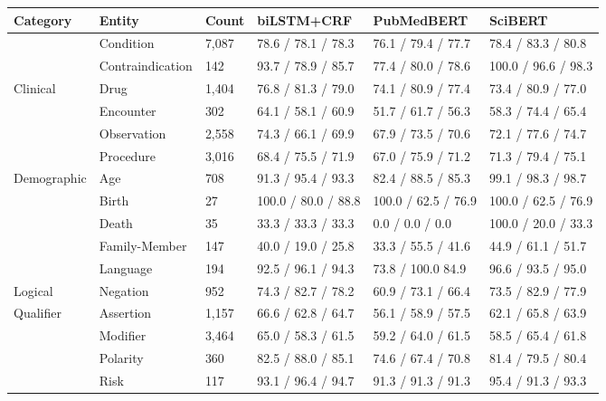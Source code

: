 \documentclass[fleqn,10pt]{wlscirep}
\begin{document}
\begin{table}[tp]
    \def\arraystretch{1.4}
\begin{tabular}{m{2cm} m{3.2cm} m{1.4cm} m{2.7cm} m{2.7cm} m{2.7cm}}
    \toprule
    \textbf{Category} & \textbf{Entity} & \textbf{Count} & \textbf{biLSTM+CRF} & \textbf{PubMedBERT} & \textbf{SciBERT} \\ \midrule
     & Condition & 7,087 & 78.6 / 78.1 / 78.3 & 76.1 / 79.4 / 77.7 & 78.4 / 83.3 / 80.8 \\
     & Contraindication & 142 & 93.7 / 78.9 / 85.7 & 77.4 / 80.0 / 78.6 & 100.0 / 96.6 / 98.3 \\
    Clinical & Drug & 1,404 & 76.8 / 81.3 / 79.0 & 74.1 / 80.9 / 77.4 & 73.4 / 80.9 / 77.0 \\
     & Encounter & 302 & 64.1 / 58.1 / 60.9 & 51.7 / 61.7 / 56.3 & 58.3 / 74.4 / 65.4 \\
     & Observation & 2,558 & 74.3 / 66.1 / 69.9 & 67.9 / 73.5 / 70.6 & 72.1 / 77.6 / 74.7 \\
     & Procedure & 3,016 & 68.4 / 75.5 / 71.9 & 67.0 / 75.9 / 71.2 & 71.3 / 79.4 / 75.1 \\
    \hline       
    \multirow{4}{}[-4pt]{\mbox{Demographic}} & 
        Age & 708 & 91.3 / 95.4 / 93.3 & 82.4 / 88.5 / 85.3 & 99.1 / 98.3 / 98.7 \\
     & Birth & 27 & 100.0 / 80.0 / 88.8 & 100.0 / 62.5 / 76.9 & 100.0 / 62.5 / 76.9 \\
     & Death & 35 & 33.3 / 33.3 / 33.3 & 0.0 / 0.0 / 0.0 & 100.0 / 20.0 / 33.3 \\
     & Family-Member & 147 & 40.0 / 19.0 / 25.8 & 33.3 / 55.5 / 41.6 & 44.9 / 61.1 / 51.7 \\
     & Language & 194 & 92.5 / 96.1 / 94.3 & 73.8 / 100.0 84.9 & 96.6 / 93.5 / 95.0 \\
    \hline
    Logical & Negation & 952 & 74.3 / 82.7 / 78.2 & 60.9 / 73.1 / 66.4 & 73.5 / 82.9 / 77.9 \\
    \hline
    \multirow{6}{}[-5pt]{\mbox{Qualifier}} &
        Assertion & 1,157 & 66.6 / 62.8 / 64.7 & 56.1 / 58.9 / 57.5 & 62.1 / 65.8 / 63.9 \\
         & Modifier & 3,464 & 65.0 / 58.3 / 61.5 & 59.2 / 64.0 / 61.5 & 58.5 / 65.4 / 61.8 \\
         & Polarity & 360 & 82.5 / 88.0 / 85.1 & 74.6 / 67.4 / 70.8 & 81.4 / 79.5 / 80.4 \\
         & Risk & 117 & 93.1 / 96.4 / 94.7 & 91.3 / 91.3 / 91.3 & 95.4 / 91.3 / 93.3 \\

\end{tabular}
\end{table}
\end{document}
